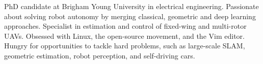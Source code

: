 

\begin{cvparagraph}

PhD candidate at Brigham Young University in electrical engineering. Passionate about solving robot autonomy by merging classical, geometric and deep learning approaches. Specialist in estimation and control of fixed-wing and multi-rotor UAVs. Obsessed with Linux, the open-source movement, and the Vim editor. Hungry for opportunities to tackle hard problems, such as large-scale SLAM, geometric estimation, robot perception, and self-driving cars.
\end{cvparagraph}
